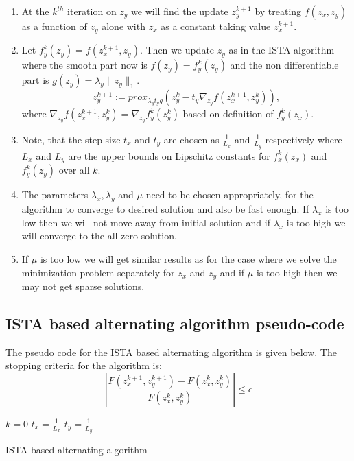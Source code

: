\begin{enumerate}
\item At the $k^{th}$ iteration on $z_y$ we will find the update $z_y^{k+1}$ by treating $f(z_x, z_y)$ as a function of $z_y$ alone with $z_x$ as a constant taking value $z_x^{k+1}$. 
\item Let $f^k_y(z_y) = f(z_x^{k+1}, z_y)$. Then we update $z_y$ as in the ISTA algorithm where the smooth part now is $f(z_y) = f^k_y(z_y)$ and the non differentiable part is $g(z_y)= \lambda_y \|z_y\|_1$.
\begin{equation}
	   z_y^{k+1} := prox_{\lambda_yt_yg} \left( z_y^k - t_y \nabla_{z_y} f(z_x^{k+1}, z_y^k) \right),
\end{equation}
where $\nabla_{z_y} f(z_x^{k+1}, z_y^k) = \nabla_{z_y} f_y^k(z_y^k)$ based on definition of $f_y^k(z_x)$.
\item Note, that the step size $t_x$ and $t_y$ are chosen as $\frac{1}{L_x}$ and $\frac{1}{L_y}$ respectively where  $L_x$ and $L_y$ are the upper bounds on Lipschitz constants for $f_x^k(z_x)$ and $f_y^k(z_y)$ over all $k$.
\item The parameters $\lambda_x, \lambda_y$ and $\mu$ need to be chosen appropriately, for the algorithm to converge to desired solution and also be fast enough. If $\lambda_x$ is too low then we will not move away from initial solution and if $\lambda_x$ is too high we will converge to the all zero solution.
\item If $\mu$ is too low we will get similar results as for the case where we solve the minimization problem separately for $z_x$ and $z_y$ and if $\mu$ is too high then we may not get sparse solutions.


\end{enumerate}

\subsection{ISTA based alternating algorithm pseudo-code}
The pseudo code for the ISTA based alternating algorithm is given below. The stopping criteria for the algorithm is:
\begin{equation}
 \left| \frac{F(z_x^{k+1}, z_y^{k+1}) - F(z_x^{k}, z_y^{k} )}{F(z_x^{k}, z_y^{k})} \right| \leq  \epsilon 
\end{equation}

\begin{algorithm}[H]
 $k = 0 $ \;
 $t_x = \frac{1}{L_x}$ \;
 $t_y = \frac{1}{L_y}$ \;
 
 \caption{ISTA based alternating algorithm}
\end{algorithm}


